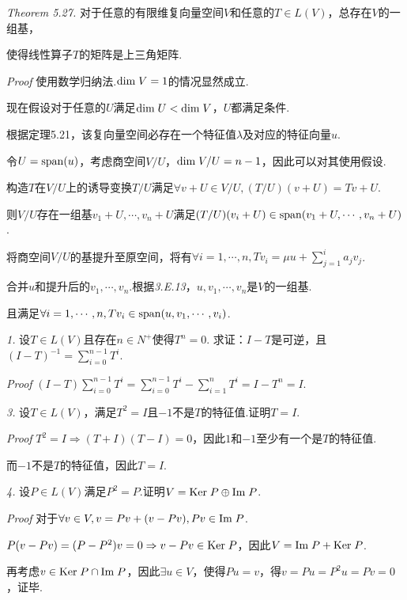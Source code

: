 \textit{Theorem 5.27.}
对于任意的有限维复向量空间\(V\)和任意的\(T \in L(V)\)，总存在\(V\)的一组基，

使得线性算子\(T\)的矩阵是上三角矩阵.

\textit{Proof}
使用数学归纳法.\(\mathrm{dim \;} V=1\)的情况显然成立.

现在假设对于任意的\(U\)满足\(\mathrm{dim \;} U<\mathrm{dim \;} V\)，\(U\)都满足条件.

根据定理5.21，该复向量空间必存在一个特征值\(\lambda\)及对应的特征向量\(u\).

令\(U=\mathrm{span}(u)\)，考虑商空间\(V/U\)，\(\mathrm{dim \;} V/U=n-1\)，因此可以对其使用假设.

构造\(T\)在\(V/U\)上的诱导变换\(T/U\)满足\(\forall v+U \in V/U,(T/U)(v+U)=Tv+U\).

则\(V/U\)存在一组基\(v_1+U,\cdots,v_n+U\)满足\((T/U)(v_i+U) \in \mathrm{span}(v_1+U,\cdots,v_n+U)\).

将商空间\(V/U\)的基提升至原空间，将有\(\forall i=1,\cdots,n,Tv_i=\mu u+\sum_{j=1}^i a_jv_j\).

合并\(u\)和提升后的\(v_1,\cdots,v_n\).根据\textit{3.E.13}，\(u,v_1,\cdots,v_n\)是\(V\)的一组基.

且满足\(\forall i=1,\cdots,n,Tv_i \in \mathrm{span}(u,v_1,\cdots,v_i)\).

\hspace*{\fill}

\textit{1.}
设\(T \in L(V)\)且存在\(n \in N^+\)使得\(T^n=0\).
求证：\(I-T\)是可逆，且\((I-T)^{-1}=\sum_{i=0}^{n-1} T^i\).

\textit{Proof}
\((I-T)\sum_{i=0}^{n-1} T^i=\sum_{i=0}^{n-1} T^i-\sum_{i=1}^n T^i=I-T^n=I\).

\hspace*{\fill}

\textit{3.}
设\(T \in L(V)\)，满足\(T^2=I\)且\(-1\)不是\(T\)的特征值.证明\(T=I\).

\textit{Proof}
\(T^2=I \Rightarrow (T+I)(T-I)=0\)，因此\(1\)和\(-1\)至少有一个是\(T\)的特征值.

而\(-1\)不是\(T\)的特征值，因此\(T=I\).

\hspace*{\fill}

\textit{4.}
设\(P \in L(V)\)满足\(P^2=P\).证明\(V=\mathrm{Ker \;} P \oplus \mathrm{Im \;} P\).

\textit{Proof}
对于\(\forall v \in V,v=Pv+(v-Pv),Pv \in \mathrm{Im \;} P\).

\(P(v-Pv)=(P-P^2)v=0 \Rightarrow v-Pv \in \mathrm{Ker \;} P\)，因此\(V=\mathrm{Im \;} P+\mathrm{Ker \;} P\).

再考虑\(v \in \mathrm{Ker \;} P \cap \mathrm{Im \;} P\)，因此\(\exists u \in V\)，使得\(Pu=v\)，得\(v=Pu=P^2u=Pv=0\)，证毕.

